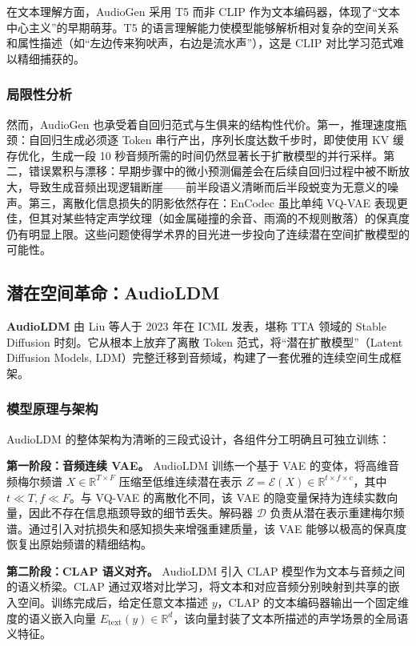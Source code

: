 \documentclass[12pt,a4paper]{article}
\begin{document}
在文本理解方面，AudioGen 采用 T5 而非 CLIP 作为文本编码器，体现了“文本中心主义”的早期萌芽。T5 的语言理解能力使模型能够解析相对复杂的空间关系和属性描述（如“左边传来狗吠声，右边是流水声”），这是 CLIP 对比学习范式难以精细捕获的。

\subsubsection{局限性分析}
然而，AudioGen 也承受着自回归范式与生俱来的结构性代价。第一，推理速度瓶颈：自回归生成必须逐 Token 串行产出，序列长度达数千步时，即使使用 KV 缓存优化，生成一段 10 秒音频所需的时间仍然显著长于扩散模型的并行采样。第二，错误累积与漂移：早期步骤中的微小预测偏差会在后续自回归过程中被不断放大，导致生成音频出现逻辑断崖——前半段语义清晰而后半段蜕变为无意义的噪声。第三，离散化信息损失的阴影依然存在：EnCodec 虽比单纯 VQ-VAE 表现更佳，但其对某些特定声学纹理（如金属碰撞的余音、雨滴的不规则散落）的保真度仍有明显上限。这些问题使得学术界的目光进一步投向了连续潜在空间扩散模型的可能性。

\subsection{潜在空间革命：AudioLDM}

\textbf{AudioLDM} 由 Liu 等人于 2023 年在 ICML 发表，堪称 TTA 领域的 Stable Diffusion 时刻。它从根本上放弃了离散 Token 范式，将“潜在扩散模型”（Latent Diffusion Models, LDM）完整迁移到音频域，构建了一套优雅的连续空间生成框架。

\subsubsection{模型原理与架构}
AudioLDM 的整体架构为清晰的三段式设计，各组件分工明确且可独立训练：

\textbf{第一阶段：音频连续 VAE。} AudioLDM 训练一个基于 VAE 的变体，将高维音频梅尔频谱 \(X \in \mathbb{R}^{T \times F}\) 压缩至低维连续潜在表示 \(Z = \mathcal{E}(X) \in \mathbb{R}^{t \times f \times c}\)，其中 \(t \ll T, f \ll F\)。与 VQ-VAE 的离散化不同，该 VAE 的隐变量保持为连续实数向量，因此不存在信息瓶颈导致的细节丢失。解码器 \(\mathcal{D}\) 负责从潜在表示重建梅尔频谱。通过引入对抗损失和感知损失来增强重建质量，该 VAE 能够以极高的保真度恢复出原始频谱的精细结构。

\textbf{第二阶段：CLAP 语义对齐。} AudioLDM 引入 CLAP 模型作为文本与音频之间的语义桥梁。CLAP 通过双塔对比学习，将文本和对应音频分别映射到共享的嵌入空间。训练完成后，给定任意文本描述 \(y\)，CLAP 的文本编码器输出一个固定维度的语义嵌入向量 \(E_{\text{text}}(y) \in \mathbb{R}^d\)，该向量封装了文本所描述的声学场景的全局语义特征。
\end{document}

